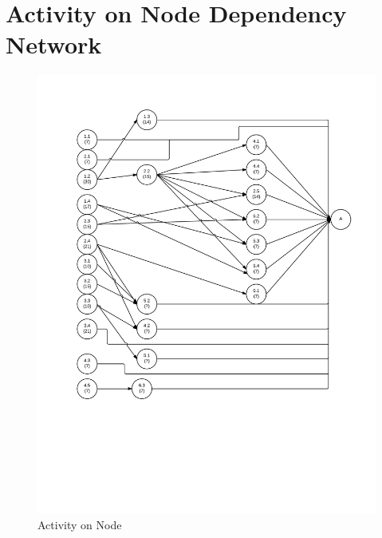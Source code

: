 \section{Activity on Node Dependency Network}
\begin{figure}[H]
\centering
\includegraphics[width=1\textwidth]{AON.jpeg}
\caption{Activity on Node}
\label{fig:Activity on Node}
\end{figure}
